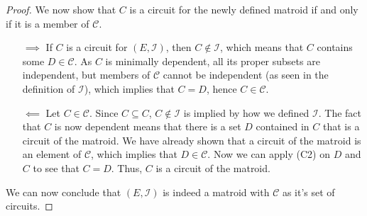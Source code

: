 \begin{proof}
We now show that $C$ is a circuit for the newly defined matroid if and only if it is a member of $\mathcal C$. 
\begin{enumerate}
  \item[$\implies$]
    If $C$ is a circuit for $(E, \mathcal I)$, then $C \not\in \mathcal I$, which means that $C$ contains some $D \in \mathcal C$. As $C$ is minimally dependent, all its proper subsets are independent, but members of $\mathcal C$ cannot be independent (as seen in the definition of $\mathcal I$), which implies that $C = D$, hence $C \in \mathcal C$.
  \item[$\impliedby$]
    Let $C \in \mathcal{C}$. Since $C\subseteq C$, $C\notin \mathcal{I}$ is implied by how we defined $\mathcal{I}$. The fact that $C$ is now dependent means that there is a set $D$ contained in $C$ that is a circuit of the matroid. We have already shown that a circuit of the matroid is an element of $\mathcal{C}$, which implies that $D\in\mathcal{C}$. Now we can apply (C2) on $D$ and $C$ to see that $C=D$. Thus, $C$ is a circuit of the matroid.


\end{enumerate}



  We can now conclude that $(E, \mathcal I)$ is indeed a matroid with $\mathcal C$ as it's set of circuits.
\end{proof}

\begin{exmp}
    
\end{exmp}

